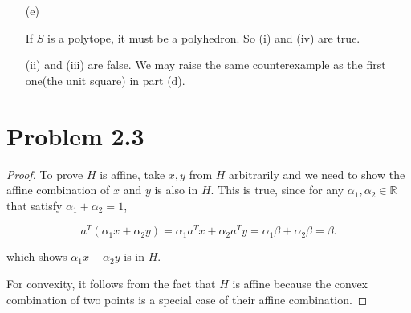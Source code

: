 \documentclass[12pt]{article}
\begin{document}
\begin{enumerate}
For (i), it is ture and we would like to show that $S$ is convex.
\begin{proof}

Take $x, y \in S$, and $\forall \alpha \in (0, 1)$, the convex combination of $x$ and $y$ is in $S$. This is true because 
$$
A(\alpha x + (1- \alpha) y) = \alpha Ax + (1-\alpha)Ay \leqslant \alpha b + (1-\alpha) b = b.
$$

Hence, $S$ is a convex set.

\end{proof}

For (ii) and (iii), they are false and we will give a counterexample in $\mathbb{R}^2$.

Let $S : = \{(x, y) | 0\leqslant x \leqslant 1, 0\leqslant y \leqslant 1 \}$. It is clear that $S$ is a polyhedron, but $S$ is neither affine nor a cone.

\vspace{50mm}

For (iv), it is false because we may give a unbounded polyhedron $S = \{(x, y) | x\geqslant 0, y\geqslant 0, x+y \geqslant 1\}$. And it is not a polytope.

\vspace{50mm}



\item[(e)]

If $S$ is a polytope, it must be a polyhedron. So (i) and (iv) are true. 

(ii) and (iii) are false. We may raise the same counterexample as the first one(the unit square) in part (d).





\end{enumerate}


\section*{Problem 2.3}

\begin{proof}

To prove $H$ is affine, take $x, y$ from $H$ arbitrarily and we need to show the affine combination of $x$ and $y$ is also in $H$. This is true, since for any $\alpha_1, \alpha_2 \in \mathbb{R}$ that satisfy $\alpha_1 + \alpha_2  =1$, 

$$
a^T(\alpha_1 x + \alpha_2 y) = \alpha_1 a^T x + \alpha_2 a^T y = \alpha_1\beta + \alpha_2 \beta = \beta.
$$

which shows $\alpha_1 x + \alpha_2 y$ is in $H$.

For convexity, it follows from the fact that $H$ is affine because the convex combination of two points is a special case of their affine combination.

\end{proof}
\end{document}

